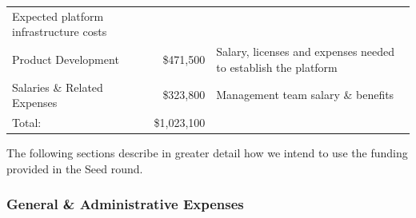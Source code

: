 \documentclass[11pt,openany]{book}
\begin{document}
\begin{longtable}[]{@{}lrl@{}}
\begin{minipage}[t]{0.50\columnwidth}
Expected platform infrastructure costs\strut
\end{minipage}\tabularnewline
\begin{minipage}[t]{0.28\columnwidth}\raggedright
Product Development\strut
\end{minipage} & \begin{minipage}[t]{0.13\columnwidth}\raggedleft
\$471,500\strut
\end{minipage} & \begin{minipage}[t]{0.50\columnwidth}\raggedright
Salary, licenses and expenses needed to establish the platform\strut
\end{minipage}\tabularnewline
\begin{minipage}[t]{0.28\columnwidth}\raggedright
Salaries \& Related Expenses\strut
\end{minipage} & \begin{minipage}[t]{0.13\columnwidth}\raggedleft
\$323,800\strut
\end{minipage} & \begin{minipage}[t]{0.50\columnwidth}\raggedright
Management team salary \& benefits\strut
\end{minipage}\tabularnewline
\begin{minipage}[t]{0.28\columnwidth}\raggedright
Total:\strut
\end{minipage} & \begin{minipage}[t]{0.13\columnwidth}\raggedleft
\$1,023,100\strut
\end{minipage} & \begin{minipage}[t]{0.50\columnwidth}\raggedright
\strut
\end{minipage}\tabularnewline
\bottomrule
\end{longtable}

The following sections describe in greater detail how we intend to use
the funding provided in the Seed round.

\newpage

\hypertarget{general-administrative-expenses}{%
\subsubsection{General \& Administrative
Expenses}\label{general-administrative-expenses}}
\end{document}
